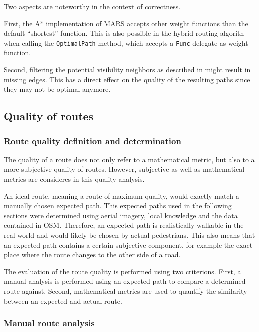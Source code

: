 		Two aspects are noteworthy in the context of correctness.
		
		First, the A* implementation of MARS accepts other weight functions than the default \enquote{shortest}-function.
		This is also possible in the hybrid routing algorith when calling the \texttt{OptimalPath} method, which accepts a \texttt{Func} delegate as weight function.
		
		Second, filtering the potential visibility neighbors as described in  might result in missing edges.
		This has a direct effect on the quality of the resulting paths since they may not be optimal anymore.
		
	\subsection{Quality of routes}
	
		\subsubsection{Route quality definition and determination}
	
			The quality of a route does not only refer to a mathematical metric, but also to a more subjective quality of routes.
			However, subjective as well as mathematical metrics are consideres in this quality analysis.
			
			An ideal route, meaning a route of maximum quality, would exactly match a manually chosen expected path.
			This expected paths used in the following sections were determined using aerial imagery, local knowledge and the data contained in OSM.
			Therefore, an expected path is realistically walkable in the real world and would likely be chosen by actual pedestrians.
			This also means that an expected path contains a certain subjective component, for example the exact place where the route changes to the other side of a road.
	
			The evaluation of the route quality is performed using two criterions.
			First, a manual analysis is performed using an expected path to compare a determined route against.
			Second, mathematical metrics are used to quantify the similarity between an expected and actual route.
		
		\subsubsection{Manual route analysis}
		
